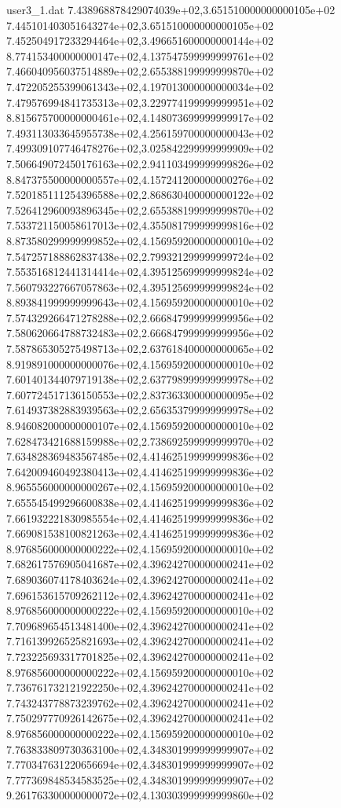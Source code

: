 \begin{filecontents}{user3_1.dat}
7.438968878429074039e+02,3.651510000000000105e+02
7.445101403051643274e+02,3.651510000000000105e+02
7.452504917233294464e+02,3.496651600000000144e+02
8.774153400000000147e+02,4.137547599999999761e+02
7.466040956037514889e+02,2.655388199999999870e+02
7.472205255399061343e+02,4.197013000000000034e+02
7.479576994841735313e+02,3.229774199999999951e+02
8.815675700000000461e+02,4.148073699999999917e+02
7.493113033645955738e+02,4.256159700000000043e+02
7.499309107746478276e+02,3.025842299999999909e+02
7.506649072450176163e+02,2.941103499999999826e+02
8.847375500000000557e+02,4.157241200000000276e+02
7.520185111254396588e+02,2.868630400000000122e+02
7.526412960093896345e+02,2.655388199999999870e+02
7.533721150058617013e+02,4.355081799999999816e+02
8.873580299999999852e+02,4.156959200000000010e+02
7.547257188862837438e+02,2.799321299999999724e+02
7.553516812441314414e+02,4.395125699999999824e+02
7.560793227667057863e+02,4.395125699999999824e+02
8.893841999999999643e+02,4.156959200000000010e+02
7.574329266471278288e+02,2.666847999999999956e+02
7.580620664788732483e+02,2.666847999999999956e+02
7.587865305275498713e+02,2.637618400000000065e+02
8.919891000000000076e+02,4.156959200000000010e+02
7.601401344079719138e+02,2.637798999999999978e+02
7.607724517136150553e+02,2.837363300000000095e+02
7.614937382883939563e+02,2.656353799999999978e+02
8.946082000000000107e+02,4.156959200000000010e+02
7.628473421688159988e+02,2.738692599999999970e+02
7.634828369483567485e+02,4.414625199999999836e+02
7.642009460492380413e+02,4.414625199999999836e+02
8.965556000000000267e+02,4.156959200000000010e+02
7.655545499296600838e+02,4.414625199999999836e+02
7.661932221830985554e+02,4.414625199999999836e+02
7.669081538100821263e+02,4.414625199999999836e+02
8.976856000000000222e+02,4.156959200000000010e+02
7.682617576905041687e+02,4.396242700000000241e+02
7.689036074178403624e+02,4.396242700000000241e+02
7.696153615709262112e+02,4.396242700000000241e+02
8.976856000000000222e+02,4.156959200000000010e+02
7.709689654513481400e+02,4.396242700000000241e+02
7.716139926525821693e+02,4.396242700000000241e+02
7.723225693317701825e+02,4.396242700000000241e+02
8.976856000000000222e+02,4.156959200000000010e+02
7.736761732121922250e+02,4.396242700000000241e+02
7.743243778873239762e+02,4.396242700000000241e+02
7.750297770926142675e+02,4.396242700000000241e+02
8.976856000000000222e+02,4.156959200000000010e+02
7.763833809730363100e+02,4.348301999999999907e+02
7.770347631220656694e+02,4.348301999999999907e+02
7.777369848534583525e+02,4.348301999999999907e+02
9.261763300000000072e+02,4.130303999999999860e+02

\end{filecontents}

